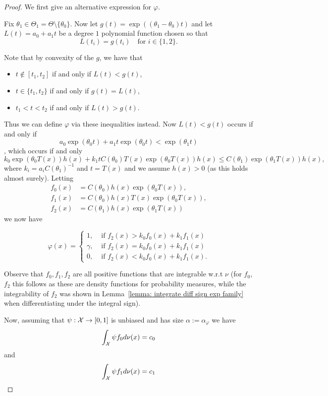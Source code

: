 \documentclass[twoside, a4paper, 10pt]{amsart}
\begin{document}
\begin{proof} We first give an alternative expression for $\varphi$.

Fix $\theta_1 \in \Theta_1 = \Theta \setminus \{ \theta_0 \}$. Now let $g(t) = \exp((\theta_1- \theta_0)t)$ and let $L(t) = a_0 + a_1t$ be a degree $1$ polynomial function chosen so that $$L(t_i) = g(t_i) \quad \text{for } i \in \{1,2\}.$$

Note that by convexity of the $g$, we have that 
\begin{itemize}
\item $t \notin [t_1,t_2]$ if and only if $L(t) < g(t)$,
\item $t \in \{t_1,t_2\}$ if and only if $g(t) = L(t)$,
\item $t_1 < t < t_2$ if and only if $L(t) > g(t)$.
\end{itemize}

Thus we can define $\varphi$ via these inequalities instead. Now $L(t) < g(t)$ occurs if and only if $$a_0 \exp(\theta_0t) + a_1 t \exp(\theta_0 t) < \exp(\theta_1 t)$$, which occurs if and only $$k_0 \exp(\theta_0 T(x)) h(x) + k_1 t C(\theta_0) T(x) \exp(\theta_0 T(x)) h(x) \leq C(\theta_1)\exp(\theta_1 T(x)) h(x),$$ where $k_i = a_i C(\theta_1)^{-1}$ and $t = T(x)$ and we assume $h(x)>0$ (as this holds almost surely). Letting 
\begin{align*} f_0(x) &= C(\theta_0) h(x)\exp(\theta_0 T(x)), \\
f_1(x) &= C(\theta_0)h(x)T(x) \exp(\theta_0 T(x)), \\
f_2(x) &= C(\theta_1) h(x) \exp(\theta_1 T(x))
\end{align*} we now have

$$\varphi(x) = \begin{cases}
1, & \text{ if } f_2(x) > k_0 f_0(x) + k_1 f_1(x) \\
\gamma, & \text{ if } f_2(x) = k_0 f_0(x) + k_1 f_1(x)  \\  
0, & \text{ if } f_2(x) < k_0 f_0(x) + k_1 f_1(x) .\end{cases}$$

Observe that $f_0, f_1, f_2$ are all positive functions that are integrable w.r.t $\nu$ (for $f_0$, $f_2$ this follows as these are density functions for probability measures, while the integrability of $f_2$ was shown in Lemma~\ref{lemma: integrate diff sign exp family} when differentiating under the integral sign).

Now, assuming that $\psi:\mathcal{X} \to [0,1]$ is unbiased and has size $\alpha := \alpha_{\varphi}$ we have 
\begin{align*} \int_{\mathcal{X}} \psi f_0 d\nu(x) = c_0 \end{align*} and 
\begin{align*} \int_{\mathcal{X}} \psi f_1 d\nu(x) = c_1\end{align*}


\end{proof}
\end{document}
